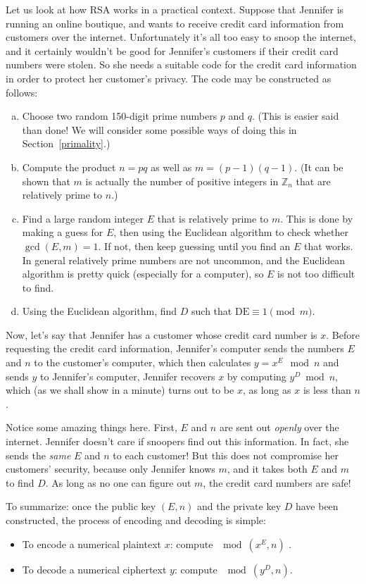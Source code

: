 Let us look at how RSA works in a practical context.  
Suppose that Jennifer is running an online boutique, and wants to receive
 credit card information from customers over the internet. Unfortunately it's all too easy to snoop the internet, 
and it certainly wouldn't be good for Jennifer's customers if their credit card numbers were stolen. 
So she needs a suitable code for the credit card information in order to protect her customer's privacy.
The code may be constructed as follows:
\begin{enumerate}[(a)]
\item 
Choose  two random 150-digit prime
numbers $p$ and $q$. (This is easier said than done!  We will consider some possible ways of doing this in Section~\ref{primality}.)
\item
Compute the product $n= pq$ as well as $ m = (p - 1)(q-1)$. 
(It can be shown that $m$ is actually the number of positive integers in $\mathbb{Z}_n$ that are relatively prime to $n$.)    
\item
Find a large random integer $E$ that is relatively prime to $m$. This is done by making a guess for $E$, then using the Euclidean algorithm to check whether $\gcd(E, m) = 1$. If not, then keep guessing until you find an $E$ that works. In general relatively prime numbers are not uncommon, and the Euclidean algorithm is pretty quick (especially for a computer), so $E$ is not too difficult to find.  
\item
Using the Euclidean algorithm, find $D$ such that $\mbox{DE} \equiv 1 \pmod{m}$. 
\end{enumerate}
 Now, let's say that Jennifer has a  customer whose credit card number is $x$.  Before requesting the credit card information, Jennifer's computer  sends the numbers  $E$ and $n$ to the customer's computer, which then calculates $y = x^E \mod n$ and sends $y$ to
Jennifer's computer, Jennifer recovers $x$ by computing  $y^D \bmod
n$, which (as we shall show in a minute) turns out to be $x$, as long as $x$ is less than $n$. 

Notice some amazing things here. First, $E$ and $n$ are sent out \emph{openly} over the internet. Jennifer doesn't care if  snoopers find out this information. In fact, she sends the \emph{same} $E$ and $n$ to each customer! But this does not compromise her customers' security, because only Jennifer knows $m$, and it takes both $E$ and $m$ to find $D$. As long as no one can figure out $m$, the credit card numbers are safe!

To summarize: once the public key $(E,n)$ and the private key $D$ have been constructed, the process of encoding and decoding is simple:
\begin{itemize}
\item
To encode a numerical plaintext $x$:  compute $\mod (x^E,n)$ .
\item
To decode a numerical ciphertext $y$: compute $\mod(y^D,n)$.
\end{itemize}
 
